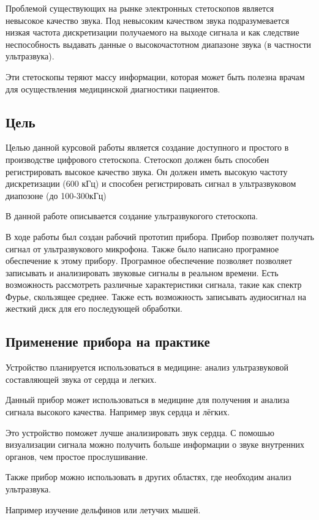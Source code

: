 Проблемой существующих на рынке электронных стетоскопов является невысокое качество звука. Под невысоким качеством звука подразумевается низкая частота дискретизации получаемого на выходе сигнала и как следствие неспособность выдавать данные о высокочастотном диапазоне звука (в частности ультразвука).

Эти стетоскопы теряют массу информации, которая может быть полезна врачам для осуществления медицинской диагностики пациентов.

\subsection{Цель}
Целью данной курсовой работы является создание доступного и простого в производстве цифрового стетоскопа. Стетоскоп должен быть способен регистрировать высокое качество звука. Он должен иметь высокую частоту дискретизации (600 кГц) и способен регистрировать сигнал в ультразвуковом диапозоне (до 100-300кГц)

В данной работе описывается создание ультразвукогого стетоскопа.

В ходе работы был создан рабочий прототип прибора. Прибор позволяет получать сигнал от ультразвукового микрофона. Также было написано програмное обеспечение к этому прибору. Програмное обеспечение позволяет позволяет записывать и анализировать звуковые сигналы в реальном времени. Есть возможность рассмотреть различные характеристики сигнала, такие как спектр Фурье, скользящее среднее. Также есть возможность записывать аудиосигнал на жесткий диск для его последующей обработки.

\subsection{Применение прибора на практике}
Устройство планируется использоваться в медицине: анализ ультразвуковой составляющей звука от сердца и легких.

Данный прибор может использоваться в медицине для получения и анализа сигнала высокого качества. Например звук сердца и лёгких. 

Это устройство поможет лучше анализировать звук сердца. С помошью визуализации сигнала можно получить больше информации о звуке внутренних органов, чем простое прослушивание.

Также прибор можно использовать в других областях, где необходим анализ ультразвука. 

Например изучение дельфинов или летучих мышей. 

